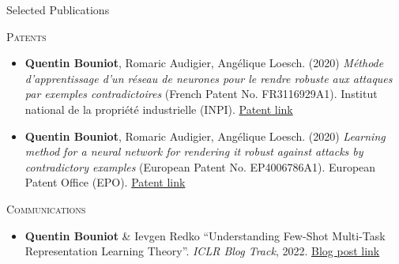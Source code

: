 \documentclass{resume} %
\begin{document}
\begin{rSection}{Selected Publications}
    \newpage
    
    \textsc{Patents}

    \begin{itemize}[label=$\cdot$]
        \item \textbf{Quentin Bouniot}, Romaric Audigier, Angélique Loesch. (2020) \emph{Méthode d'apprentissage d'un réseau de neurones pour le rendre robuste aux attaques par exemples contradictoires} (French Patent No. FR3116929A1). Institut national de la propriété industrielle (INPI).
        \href{https://data.inpi.fr/brevets/FR3116929}{Patent link}

        \item \textbf{Quentin Bouniot}, Romaric Audigier, Angélique Loesch. (2020) \emph{Learning method for a neural network for rendering it robust against attacks by contradictory examples} (European Patent No. EP4006786A1). European Patent Office (EPO). \href{https://worldwide.espacenet.com/publicationDetails/biblio?locale=en_EP&CC=EP&date=20220601&NR=4006786A1&ND=3&KC=A1&rnd=1699608498751&FT=D#}{Patent link}
    \end{itemize}

    \textsc{Communications}

    \begin{itemize}[label=$\cdot$]
    \item \textbf{Quentin Bouniot} \& Ievgen Redko ``Understanding Few-Shot Multi-Task Representation Learning Theory''. \emph{ICLR Blog Track}, 2022. \href{https://iclr-blog-track.github.io/2022/03/25/understanding_mtr_meta/}{Blog post link}
    \end{itemize}




\end{rSection}
\end{document}
